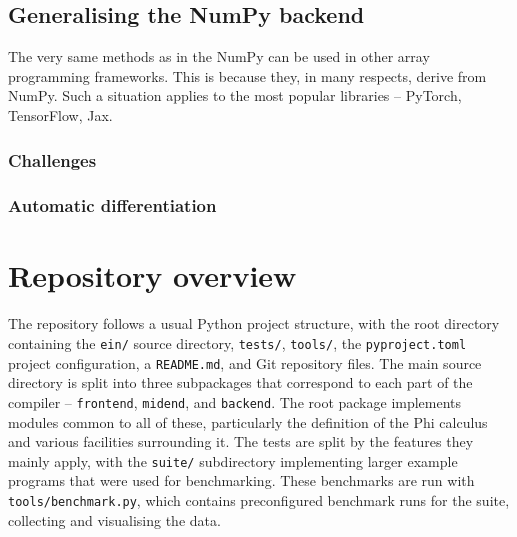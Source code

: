 \subsection{Generalising the NumPy backend}

The very same methods as in the NumPy can be used in other array programming frameworks. This is because they, in many respects, derive from NumPy. Such a situation applies to the most popular libraries -- PyTorch, TensorFlow, Jax.

\subsubsection{Challenges}

\subsubsection{Automatic differentiation}

\section{Repository overview}

The repository follows a usual Python project structure, with the root directory containing the \texttt{ein/} source directory, \texttt{tests/}, \texttt{tools/}, the \texttt{pyproject.toml} project configuration, a \texttt{README.md}, and Git repository files. The main source directory is split into three subpackages that correspond to each part of the compiler -- \texttt{frontend}, \texttt{midend}, and \texttt{backend}. The root package implements modules common to all of these, particularly the definition of the Phi calculus and various facilities surrounding it. The tests are split by the features they mainly apply, with the \texttt{suite/} subdirectory implementing larger example programs that were used for benchmarking. These benchmarks are run with \texttt{tools/benchmark.py}, which contains preconfigured benchmark runs for the suite, collecting and visualising the data.
